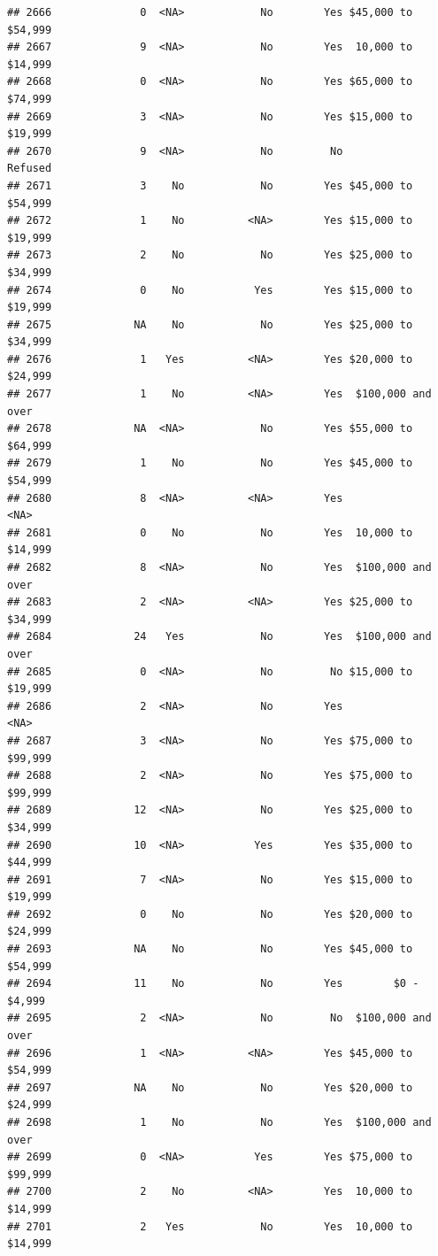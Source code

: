 \documentclass[man]{apa6}
\begin{document}
\begin{verbatim}
## 2666              0  <NA>            No        Yes $45,000 to $54,999
## 2667              9  <NA>            No        Yes  10,000 to $14,999
## 2668              0  <NA>            No        Yes $65,000 to $74,999
## 2669              3  <NA>            No        Yes $15,000 to $19,999
## 2670              9  <NA>            No         No            Refused
## 2671              3    No            No        Yes $45,000 to $54,999
## 2672              1    No          <NA>        Yes $15,000 to $19,999
## 2673              2    No            No        Yes $25,000 to $34,999
## 2674              0    No           Yes        Yes $15,000 to $19,999
## 2675             NA    No            No        Yes $25,000 to $34,999
## 2676              1   Yes          <NA>        Yes $20,000 to $24,999
## 2677              1    No          <NA>        Yes  $100,000 and over
## 2678             NA  <NA>            No        Yes $55,000 to $64,999
## 2679              1    No            No        Yes $45,000 to $54,999
## 2680              8  <NA>          <NA>        Yes               <NA>
## 2681              0    No            No        Yes  10,000 to $14,999
## 2682              8  <NA>            No        Yes  $100,000 and over
## 2683              2  <NA>          <NA>        Yes $25,000 to $34,999
## 2684             24   Yes            No        Yes  $100,000 and over
## 2685              0  <NA>            No         No $15,000 to $19,999
## 2686              2  <NA>            No        Yes               <NA>
## 2687              3  <NA>            No        Yes $75,000 to $99,999
## 2688              2  <NA>            No        Yes $75,000 to $99,999
## 2689             12  <NA>            No        Yes $25,000 to $34,999
## 2690             10  <NA>           Yes        Yes $35,000 to $44,999
## 2691              7  <NA>            No        Yes $15,000 to $19,999
## 2692              0    No            No        Yes $20,000 to $24,999
## 2693             NA    No            No        Yes $45,000 to $54,999
## 2694             11    No            No        Yes        $0 - $4,999
## 2695              2  <NA>            No         No  $100,000 and over
## 2696              1  <NA>          <NA>        Yes $45,000 to $54,999
## 2697             NA    No            No        Yes $20,000 to $24,999
## 2698              1    No            No        Yes  $100,000 and over
## 2699              0  <NA>           Yes        Yes $75,000 to $99,999
## 2700              2    No          <NA>        Yes  10,000 to $14,999
## 2701              2   Yes            No        Yes  10,000 to $14,999

\end{verbatim}
\end{document}
